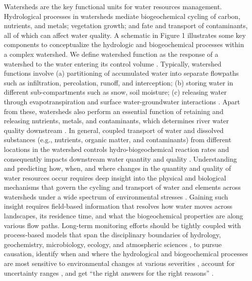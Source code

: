 \documentclass[preprint,review, 12pt]{elsarticle}
\begin{document}
Watersheds are the key functional units for water resources management. Hydrological processes in watersheds mediate biogeochemical cycling of carbon, nutrients, and metals; vegetation growth; and fate and transport of contaminants, all of which can affect water quality. A schematic in Figure 1 illustrates some key components to conceptualize the hydrologic and biogeochemical processes within a complex watershed.  We define watershed function as the response of a watershed to the water entering its control volume \citep{wagener2007catchment}. Typically, watershed functions involve (a) partitioning of accumulated water into separate flowpaths such as infiltration, percolation, runoff, and interception; (b) storing water in different sub-compartments such as snow, soil moisture; (c) releasing water through evapotranspiration and surface water-groundwater interactions \citep{Sivapalan2005, wagener2007catchment}. Apart from these, watersheds also perform an essential function of retaining and releasing nutrients, metals, and contaminants, which determines river water quality downstream \citep{Hubbard2018}. In general, coupled transport of water and dissolved substances (e.g., nutrients, organic matter, and contaminants) from different locations in the watershed controls hydro-biogeochemical reaction rates and consequently impacts downstream water quantity and quality \citep{kirchner2006getting}. Understanding and predicting how, when, and where changes in the quantity and quality of water resources occur requires deep insight into the physical and biological mechanisms that govern the cycling and transport of water and elements across watersheds under a wide spectrum of environmental stresses \citep{Laudon2018b}. Gaining such insight requires field-based information that resolves how water moves across landscapes, its residence time, and what the biogeochemical properties are along various flow paths. Long-term monitoring efforts should be tightly coupled with process-based models that span the disciplinary boundaries of hydrology, geochemistry, microbiology, ecology, and atmospheric sciences \citep{Bao2017b, Seibert2002}, to pursue causation, identify when and where the hydrological and biogeochemical processes are most sensitive to environmental changes at various severities \citep{Laudon2018b, Murdoch2014}, account for uncertainty ranges \citep{Fatichi2016}, and get “the right answers for the right reasons” \citep{kirchner2006getting}.  
\end{document}
